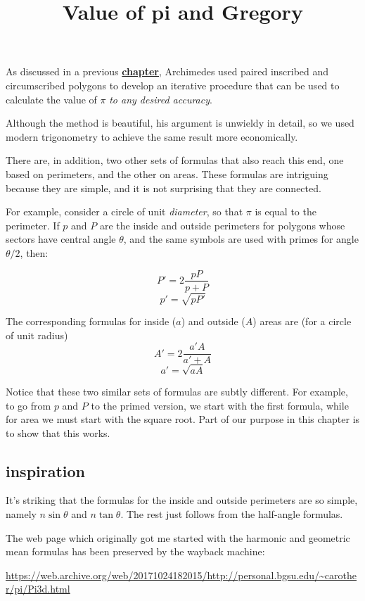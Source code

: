 \documentclass[11pt, oneside]{article}
\title{Value of pi and Gregory}
\date{}
\begin{document}
\maketitle
\Large
\label{sec:Gregory}

As discussed in a previous \hyperref[sec:Value_of_pi]{\textbf{chapter}}, Archimedes used paired inscribed and circumscribed polygons to develop an iterative procedure that can be used to calculate the value of $\pi$ \emph{to any desired accuracy}.  

Although the method is beautiful, his argument is unwieldy in detail, so we used modern trigonometry to achieve the same result more economically.

There are, in addition, two other sets of formulas that also reach this end, one based on perimeters, and the other on areas.  These formulas are intriguing because they are simple, and it is not surprising that they are connected.  

For example, consider a circle of unit \emph{diameter}, so that $\pi$ is equal to the perimeter.  If $p$ and $P$ are the inside and outside perimeters for polygons whose sectors have central angle $\theta$, and the same symbols are used with primes for angle $\theta/2$, then:

\[ P' = 2 \frac{pP}{p + P} \]
\[ p' = \sqrt{pP'} \]

The corresponding formulas for inside ($a$) and outside ($A$) areas are (for a circle of unit radius)
\[ A' = 2 \frac{a'A}{a' + A} \]
\[ a' = \sqrt{aA} \]

Notice that these two similar sets of formulas are subtly different.  For example, to go from $p$ and $P$ to the primed version, we start with the first formula, while for area we must start with the square root.  Part of our purpose in this chapter is to show that this works.

\subsection*{inspiration}

It's striking that the formulas for the inside and outside perimeters are so simple, namely $n \sin \theta$ and $n \tan \theta$.  The rest just follows from the half-angle formulas.

The web page which originally got me started with the harmonic and geometric mean formulas has been preserved by the wayback machine:

\url{https://web.archive.org/web/20171024182015/http://personal.bgsu.edu/~carother/pi/Pi3d.html}
\end{document}
